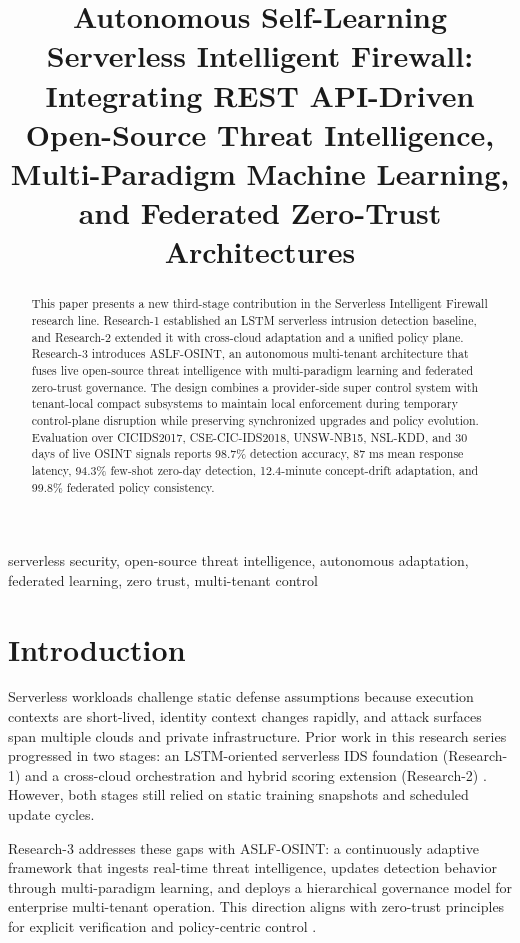 \documentclass[conference]{IEEEtran}
\title{Autonomous Self-Learning Serverless Intelligent Firewall:\\
Integrating REST API-Driven Open-Source Threat Intelligence,\\
Multi-Paradigm Machine Learning, and Federated Zero-Trust Architectures}
\author{\IEEEauthorblockN{Md Anisur Rahman Chowdhury and Kefei Wang}
\IEEEauthorblockA{Department of Computer and Information Science, Gannon University, USA\\
\texttt{engr.aanis@gmail.com}}}
\begin{document}
\maketitle

\begin{abstract}
This paper presents a new third-stage contribution in the Serverless Intelligent Firewall research line. Research-1 established an LSTM serverless intrusion detection baseline, and Research-2 extended it with cross-cloud adaptation and a unified policy plane. Research-3 introduces ASLF-OSINT, an autonomous multi-tenant architecture that fuses live open-source threat intelligence with multi-paradigm learning and federated zero-trust governance. The design combines a provider-side super control system with tenant-local compact subsystems to maintain local enforcement during temporary control-plane disruption while preserving synchronized upgrades and policy evolution. Evaluation over CICIDS2017, CSE-CIC-IDS2018, UNSW-NB15, NSL-KDD, and 30 days of live OSINT signals reports 98.7\% detection accuracy, 87 ms mean response latency, 94.3\% few-shot zero-day detection, 12.4-minute concept-drift adaptation, and 99.8\% federated policy consistency.
\end{abstract}

\begin{IEEEkeywords}
serverless security, open-source threat intelligence, autonomous adaptation, federated learning, zero trust, multi-tenant control
\end{IEEEkeywords}

\section{Introduction}
Serverless workloads challenge static defense assumptions because execution contexts are short-lived, identity context changes rapidly, and attack surfaces span multiple clouds and private infrastructure. Prior work in this research series progressed in two stages: an LSTM-oriented serverless IDS foundation (Research-1) and a cross-cloud orchestration and hybrid scoring extension (Research-2) \cite{chowdhury2025research1,chowdhury2026research2}. However, both stages still relied on static training snapshots and scheduled update cycles.

Research-3 addresses these gaps with ASLF-OSINT: a continuously adaptive framework that ingests real-time threat intelligence, updates detection behavior through multi-paradigm learning, and deploys a hierarchical governance model for enterprise multi-tenant operation. This direction aligns with zero-trust principles for explicit verification and policy-centric control \cite{rose2020nist}.
\end{document}
